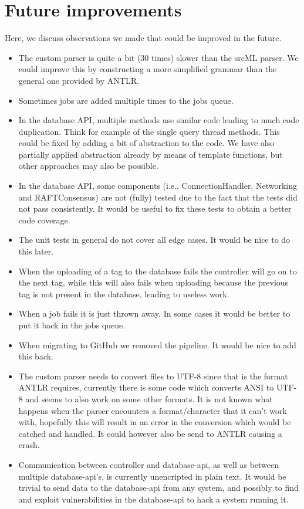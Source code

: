 \documentclass[./Main.tex]{subfiles}
\begin{document}
\section{Future improvements}
Here, we discuss observations we made that could be improved in the future.

\begin{itemize}
    \item The custom parser is quite a bit (30 times) slower than the srcML parser. We could improve this by constructing a more simplified grammar than the general one provided by ANTLR.
    \item Sometimes jobs are added multiple times to the jobs queue.
    \item In the database API, multiple methods use similar code leading to much code duplication. Think for example of the single query thread methods. This could be fixed by adding a bit of abstraction to the code. We have also partially applied abstraction already by means of template functions, but other approaches may also be possible.
    \item In the database API, some components (i.e., ConnectionHandler, Networking and RAFTConsensus) are not (fully) tested due to the fact that the tests did not pass consistently. It would be useful to fix these tests to obtain a better code coverage.
    \item The unit tests in general do not cover all edge cases. It would be nice to do this later.
    \item When the uploading of a tag to the database fails the controller will go on to the next tag, while this will also fails when uploading because the previous tag is not present in the database, leading to useless work.
    \item When a job fails it is just thrown away. In some cases it would be better to put it back in the jobs queue.
    \item When migrating to GitHub we removed the pipeline. It would be nice to add this back.
    \item The custom parser needs to convert files to UTF-8 since that is the format ANTLR requires, currently there is some code which converts ANSI to UTF-8 and seems to also work on some other formats. It is not known what happens when the parser encounters a format/character that it can't work with, hopefully this will result in an error in the conversion which would be catched and handled. It could however also be send to ANTLR causing a crash.
    \item Communication between controller and database-api, as well as between multiple database-api's, is currently unencripted in plain text. It would be trivial to send data to the database-api from any system, and possibly to find and exploit vulnerabilities in the database-api to hack a system running it.

\end{itemize}
\end{document}
